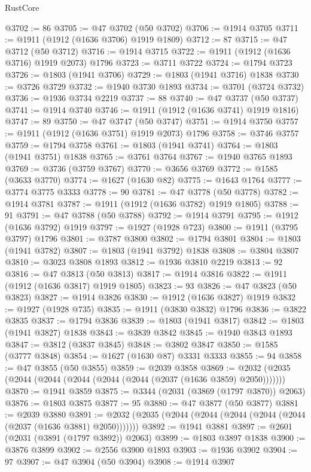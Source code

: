\begin{lexlean}{RustCore}
\begin{coremodule}
@3702 := 86
@3705 := @47 @3702 (@50 @3702)
@3706 := @1914 @3705
@3711 := @1911 (@1912 (@1636 @3706) @1919 @1809)
@3712 := 87
@3715 := @47 @3712 (@50 @3712)
@3716 := @1914 @3715
@3722 := @1911 (@1912 (@1636 @3716) @1919 @2073) @1796
@3723 := @3711 @3722
@3724 := @1794 @3723
@3726 := @1803 (@1941 @3706)
@3729 := @1803 (@1941 @3716) @1838
@3730 := @3726 @3729
@3732 := @1940 @3730 @1893
@3734 := @3701 (@3724 @3732)
@3736 := @1936 @3734 @2219
@3737 := 88
@3740 := @47 @3737 (@50 @3737)
@3741 := @1914 @3740
@3746 := @1911 (@1912 (@1636 @3741) @1919 @1816)
@3747 := 89
@3750 := @47 @3747 (@50 @3747)
@3751 := @1914 @3750
@3757 := @1911 (@1912 (@1636 @3751) @1919 @2073) @1796
@3758 := @3746 @3757
@3759 := @1794 @3758
@3761 := @1803 (@1941 @3741)
@3764 := @1803 (@1941 @3751) @1838
@3765 := @3761 @3764
@3767 := @1940 @3765 @1893
@3769 := @3736 (@3759 @3767)
@3770 := @3656 @3769
@3772 := @1585 (@3633 @3770)
@3774 := @1627 (@1630 @82)
@3775 := @1643 @1764
@3777 := @3774 @3775 @3333
@3778 := 90
@3781 := @47 @3778 (@50 @3778)
@3782 := @1914 @3781
@3787 := @1911 (@1912 (@1636 @3782) @1919 @1805)
@3788 := 91
@3791 := @47 @3788 (@50 @3788)
@3792 := @1914 @3791
@3795 := @1912 (@1636 @3792) @1919
@3797 := @1927 (@1928 @723)
@3800 := @1911 (@3795 @3797) @1796
@3801 := @3787 @3800
@3802 := @1794 @3801
@3804 := @1803 (@1941 @3782)
@3807 := @1803 (@1941 @3792) @1838
@3808 := @3804 @3807
@3810 := @3023 @3808 @1893
@3812 := @1936 @3810 @2219
@3813 := 92
@3816 := @47 @3813 (@50 @3813)
@3817 := @1914 @3816
@3822 := @1911 (@1912 (@1636 @3817) @1919 @1805)
@3823 := 93
@3826 := @47 @3823 (@50 @3823)
@3827 := @1914 @3826
@3830 := @1912 (@1636 @3827) @1919
@3832 := @1927 (@1928 @735)
@3835 := @1911 (@3830 @3832) @1796
@3836 := @3822 @3835
@3837 := @1794 @3836
@3839 := @1803 (@1941 @3817)
@3842 := @1803 (@1941 @3827) @1838
@3843 := @3839 @3842
@3845 := @1940 @3843 @1893
@3847 := @3812 (@3837 @3845)
@3848 := @3802 @3847
@3850 := @1585 (@3777 @3848)
@3854 := @1627 (@1630 @87) @3331 @3333
@3855 := 94
@3858 := @47 @3855 (@50 @3855)
@3859 := @2039 @3858
@3869 := @2032 (@2035 (@2044 (@2044 (@2044 (@2044 (@2044 (@2037 (@1636 @3859) @2050)))))))
@3870 := @1941 @3859
@3875 := @3344 (@2031 (@3869 (@1797 @3870)) @2063)
@3876 := @1803 @3875
@3877 := 95
@3880 := @47 @3877 (@50 @3877)
@3881 := @2039 @3880
@3891 := @2032 (@2035 (@2044 (@2044 (@2044 (@2044 (@2044 (@2037 (@1636 @3881) @2050)))))))
@3892 := @1941 @3881
@3897 := @2601 (@2031 (@3891 (@1797 @3892)) @2063)
@3899 := @1803 @3897 @1838
@3900 := @3876 @3899
@3902 := @2556 @3900 @1893
@3903 := @1936 @3902
@3904 := 97
@3907 := @47 @3904 (@50 @3904)
@3908 := @1914 @3907

\end{coremodule}
\end{lexlean}

